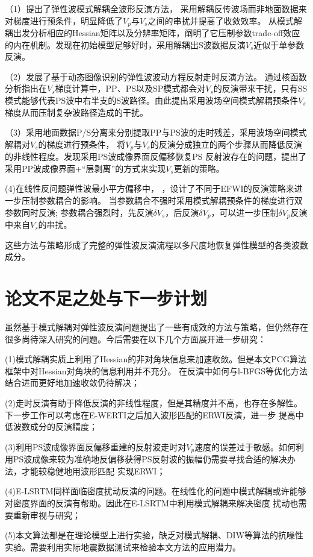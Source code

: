 （1）提出了弹性波模式解耦全波形反演方法，
采用解耦反传波场而非地面数据来对梯度进行预条件，明显降低了$V_p$与$V_s$之间的串扰并提高了收敛效率。
从模式解耦出发分析相应的Hessian矩阵以及分辨率矩阵，阐明了它压制参数trade-off效应的内在机制。发现在初始模型足够好时，采用解耦出S波数据反演$V_s$近似于单参数反演。

（2）发展了基于动态图像识别的弹性波波动方程反射走时反演方法。
通过核函数分析指出在$V_s$梯度计算中，PP、PS以及SP模式都会对$V_s$的反演带来干扰，只有SS模式能够代表PS波中右半支的S波路径。由此提出采用波场空间模式解耦预条件$V_s$
梯度从而压制复杂波路径造成的干扰。


（3）采用地面数据P/S分离来分别提取PP与PS波的走时残差，采用波场空间模式解耦对$V_s$的梯度进行预条件，
将$V_p$与$V_s$的反演分成独立的两个步骤从而降低反演的非线性程度。发现采用PS波成像界面反偏移恢复PS
反射波存在的问题，提出了采用PP波成像界面+“层剥离”的方式来实现$V_s$更新的策略。

(4)在线性反问题弹性波最小平方偏移中，
，设计了不同于EFWI的反演策略来进一步压制参数耦合的影响。
当参数耦合不强时采用模式解耦预条件的梯度进行双参数同时反演;
参数耦合强烈时，先反演$\delta V_s$，后反演$\delta V_p$，可以进一步压制$\delta
V_p$反演中来自$V_s$的串扰。

这些方法与策略形成了完整的弹性波反演流程以多尺度地恢复弹性模型的各类波数成分。

\section{论文不足之处与下一步计划}
虽然基于模式解耦对弹性波反演问题提出了一些有成效的方法与策略，但仍然存在很多尚待深入研究的问题。今后需要在以下几个方面展开进一步研究：

(1)模式解耦实质上利用了Hessian的非对角块信息来加速收敛。但是本文PCG算法框架中对Hessian对角块的信息利用并不充分。
在反演中如何与l-BFGS等优化方法结合进而更好地加速收敛仍待解决；

(2)走时反演有助于降低反演的非线性程度，但是其精度并不高，也存在多解性。下一步工作可以考虑在E-WERTI之后加入波形匹配的ERWI反演，进一步
提高中低波数成分的反演精度；

(3)利用PS波成像界面反偏移重建的反射波走时对$V_p$速度的误差过于敏感。如何利用PS波成像来较为准确地反偏移获得PS反射波的振幅仍需要寻找合适的解决办法，才能较稳健地用波形匹配
实现ERWI；

(4)E-LSRTM同样面临密度扰动反演的问题。在线性化的问题中模式解耦或许能够对密度界面的反演有帮助。因此在E-LSRTM中利用模式解耦来解决密度
扰动也需要重新审视与研究；

(5)本文算法都是在理论模型上进行实验，缺乏对模式解耦、DIW等算法的抗噪性实验。需要利用实际地震数据测试来检验本文方法的应用潜力。

